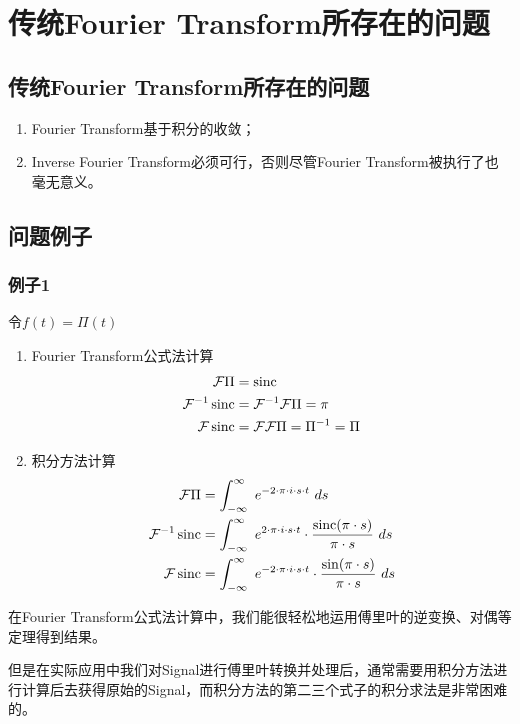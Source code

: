 \section{传统Fourier Transform所存在的问题}
\subsection{传统Fourier Transform所存在的问题}
\begin{enumerate}
	\item Fourier Transform基于积分的收敛；
	\item Inverse Fourier Transform必须可行，否则尽管Fourier Transform被执行了也毫无意义。
\end{enumerate}
\subsection{问题例子}
\subsubsection{例子1}
令$f(t)=\Pi(t)$
\begin{enumerate}
	\item Fourier Transform公式法计算
	      \begin{align*}
		      \mathcal{F}\Pi        & =\operatorname{sinc}                                  \\
		      \mathcal{F}^{-1}\operatorname{sinc} & =\mathcal{F}^{-1}\mathcal{F}\Pi=\pi     \\
		      \mathcal{F}\operatorname{sinc}      & =\mathcal{F}\mathcal{F}\Pi=\Pi^{-1}=\Pi
	      \end{align*}
	\item 积分方法计算
	      \begin{align*}
		      \mathcal{F}\Pi        & =\int_{-\infty}^{\infty}\ e^{-2\cdot \pi\cdot i\cdot s\cdot t}\ ds                                           \\
		      \mathcal{F}^{-1}\sinc & =\int_{-\infty}^{\infty}\ e^{2\cdot \pi\cdot i\cdot s\cdot t}\cdot \frac{\sinc (\pi\cdot s)}{\pi\cdot s}\ ds \\
		      \mathcal{F}\sinc      & =\int_{-\infty}^{\infty}\ e^{-2\cdot \pi\cdot i\cdot s\cdot t}\cdot \frac{\sin (\pi\cdot s)}{\pi\cdot s}\ ds
	      \end{align*}
\end{enumerate}

在Fourier Transform公式法计算中，我们能很轻松地运用傅里叶的逆变换、对偶等定理得到结果。

但是在实际应用中我们对Signal进行傅里叶转换并处理后，通常需要用积分方法进行计算后去获得原始的Signal，而积分方法的第二三个式子的积分求法是非常困难的。

